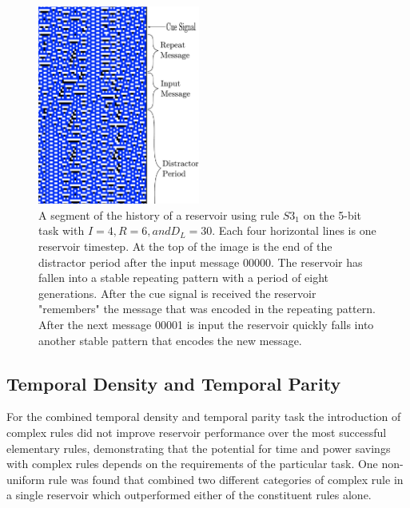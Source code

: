 \documentclass{elsarticle}
\begin{document}
\begin{multicols}{2}
	
	\begin{figure}[H]
		\centering
		\includegraphics[width=0.475\textwidth]{RepeatMessage.pdf}
		\caption{A segment of the history of a reservoir using rule $S3_{1}$ on the 
			5-bit task with $I=4, R=6, and D_{L}=30$. Each four horizontal lines is one 
			reservoir timestep. At the top of the image is the end of the distractor 
			period after the input message 00000. The reservoir has fallen into a 
			stable repeating pattern with a period of eight generations. After the 
			cue signal is received the reservoir "remembers" the message that was 
			encoded in the repeating pattern. After the next message 00001 is input 
			the reservoir quickly falls into another stable pattern that encodes the 
		new message.} 
		
		\label{repeat}
	\end{figure}
	
	\subsection{Temporal Density and Temporal Parity}
	For the combined temporal density and temporal parity task the introduction of 
	complex rules did not improve reservoir performance over the most successful 
	elementary rules, demonstrating that the potential for time and power savings 
	with complex rules depends on the requirements of the particular task. One 
	non-uniform rule was found that combined two different categories of complex 
	rule in a single reservoir which outperformed either of the constituent rules 
	alone.
	
	
	
	
	\iffalse
	

\end{multicols}
\end{document}
